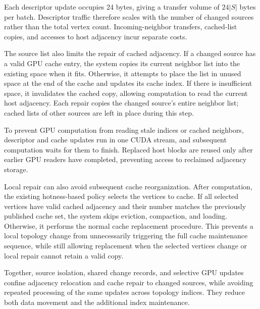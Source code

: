 Each descriptor update occupies 24 bytes, giving a transfer volume of $24|S|$ bytes per batch. Descriptor traffic therefore scales with the number of changed sources rather than the total vertex count. Incoming-neighbor transfers, cached-list copies, and accesses to host adjacency incur separate costs.

The source list also limits the repair of cached adjacency. If a changed source has a valid GPU cache entry, the system copies its current neighbor list into the existing space when it fits. Otherwise, it attempts to place the list in unused space at the end of the cache and updates its cache index. If there is insufficient space, it invalidates the cached copy, allowing computation to read the current host adjacency. Each repair copies the changed source's entire neighbor list; cached lists of other sources are left in place during this step.

To prevent GPU computation from reading stale indices or cached neighbors, descriptor and cache updates run in one CUDA stream, and subsequent computation waits for them to finish. Replaced host blocks are reused only after earlier GPU readers have completed, preventing access to reclaimed adjacency storage.

Local repair can also avoid subsequent cache reorganization. After computation, the existing hotness-based policy selects the vertices to cache. If all selected vertices have valid cached adjacency and their number matches the previously published cache set, the system skips eviction, compaction, and loading. Otherwise, it performs the normal cache replacement procedure. This prevents a local topology change from unnecessarily triggering the full cache maintenance sequence, while still allowing replacement when the selected vertices change or local repair cannot retain a valid copy.

Together, source isolation, shared change records, and selective GPU updates confine adjacency relocation and cache repair to changed sources, while avoiding repeated processing of the same updates across topology indices. They reduce both data movement and the additional index maintenance.
